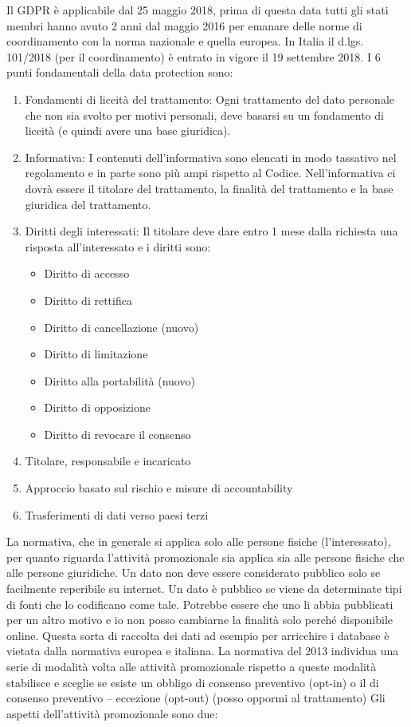 \documentclass[a4page, 11pt, twocolumn]{article}
\begin{document}
Il GDPR è applicabile dal 25 maggio 2018, prima di questa data tutti gli stati membri hanno avuto 2 anni dal maggio 2016 per emanare delle norme di coordinamento con la norma nazionale e quella europea. In Italia il d.lgs. 101/2018 (per il coordinamento) è entrato in vigore il 19 settembre 2018. 
I 6 punti fondamentali della data protection sono:
\begin{enumerate}
	\item Fondamenti di liceità del trattamento: Ogni trattamento del dato personale che non sia svolto per motivi personali, deve basarsi su un fondamento di liceità (e quindi avere una base giuridica).
	\item Informativa: I contenuti dell’informativa sono elencati in modo tassativo nel regolamento e in parte sono più ampi rispetto al Codice. Nell’informativa ci dovrà essere il titolare del trattamento, la finalità del trattamento e la base giuridica del trattamento.
	\item Diritti degli interessati: Il titolare deve dare entro 1 mese dalla richiesta una risposta all’interessato e i diritti sono:
	\begin{itemize}
		\item Diritto di accesso
		\item Diritto di rettifica
		\item Diritto di cancellazione (nuovo)
		\item Diritto di limitazione
		\item Diritto alla portabilità (nuovo)
		\item Diritto di opposizione
		\item Diritto di revocare il consenso
	\end{itemize}
	\item Titolare, responsabile e incaricato
	\item Approccio basato sul rischio e misure di accountability
	\item Trasferimenti di dati verso paesi terzi
\end{enumerate}

La normativa, che in generale si applica solo alle persone fisiche (l’interessato), per quanto riguarda l’attività promozionale sia applica sia alle persone fisiche che alle persone giuridiche. Un dato non deve essere considerato pubblico solo se facilmente reperibile su internet. Un dato è pubblico se viene da determinate tipi di fonti che lo codificano come tale. Potrebbe essere che uno li abbia pubblicati per un altro motivo e io non posso cambiarne la finalità solo perché disponibile online. Questa sorta di raccolta dei dati ad esempio per arricchire i database è vietata dalla normativa europea e italiana. La normativa del 2013 individua una serie di modalità volta alle attività promozionale rispetto a queste modalità stabilisce e sceglie se esiste un obbligo di consenso preventivo (opt-in) o il di consenso preventivo – eccezione (opt-out) (posso oppormi al trattamento) 
Gli aspetti dell’attività promozionale sono due: 
\end{document}
